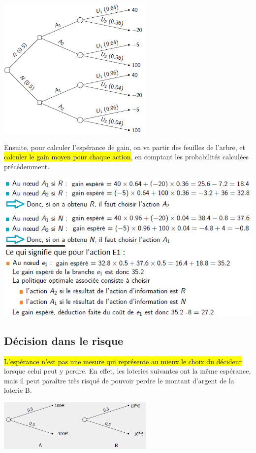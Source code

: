 \documentclass[a4paper, 12pt]{article}
\newcommand{\alinea}{
\hspace*{0.5cm}}
\begin{document}
			\begin{center}
				\includegraphics[width=3in]{Images/urnes4}
			\end{center}
			Ensuite, pour calculer l'espérance de gain, on va partir des feuilles de l'arbre, et \hl{calculer le gain moyen 
				pour chaque action}, en comptant les probabilités calculées précédemment.
			\begin{center}
				\includegraphics[width=5.5in]{Images/urnes2}
			\end{center}
	\subsection{Décision dans le risque}
		\alinea \hl{L'espérance n'est pas une mesure qui représente au mieux le choix du décideur} lorsque celui peut y perdre.
			En effet, les loteries suivantes ont la même espérance, mais il peut paraître très risqué de pouvoir perdre 
			le montant d'argent de la loterie B.
		\begin{center}
			\includegraphics[width=3in]{Images/loteries}
		\end{center}
\end{document}
